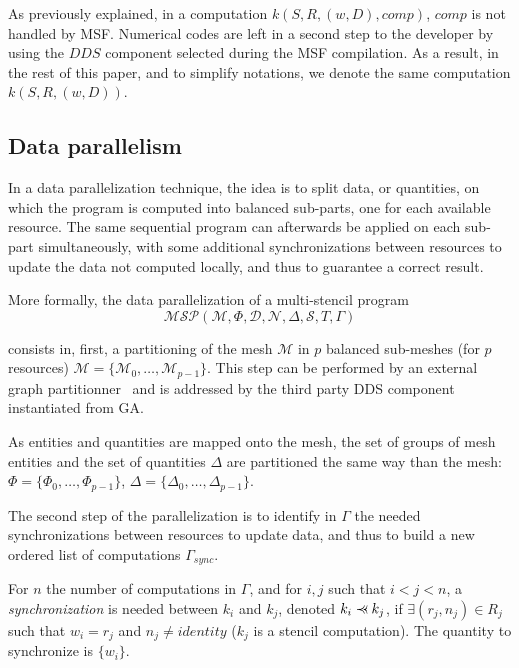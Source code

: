 As previously explained, in a computation $k(S,R,(w,D),comp)$, $comp$ is not handled by MSF. Numerical codes are left in a second step to the developer by using the $DDS$ component selected during the MSF compilation. As a result, in the rest of this paper, and to simplify notations, we denote the same computation $k(S,R,(w,D))$.

\subsection{Data parallelism}
\label{sect:dataparal}
In a data parallelization technique, the idea is to split data, or quantities, on which the program is computed into balanced sub-parts, one for each available resource. The same sequential program can afterwards be applied on each sub-part simultaneously, with some additional synchronizations between resources to update the data not computed locally, and thus to guarantee a correct result.

\medskip
More formally, the data parallelization of a multi-stencil program 
\begin{equation*}
\mathcal{MSP}(\mathcal{M},\Phi,\mathcal{D},\mathcal{N},\Delta, \mathcal{S},T,\Gamma)
\end{equation*}

consists in, first, a partitioning of the mesh $\mathcal{M}$ in $p$ balanced sub-meshes (for $p$ resources) $\mathcal{M}=\{\mathcal{M}_0,\dots,\mathcal{M}_{p-1}\}$. This step can be performed by an external graph partitionner~\cite{Pellegrini:1996:SSP:645560.658570,DBLP:conf/ieeehpcs/HeleneS13,lachat:hal-00768916} and is addressed by the third party DDS component instantiated from GA. 

As entities and quantities are mapped onto the mesh, the set of groups of mesh entities and the set of quantities $\Delta$ are partitioned the same way than the mesh: $\Phi=\{\Phi_0,\dots,\Phi_{p-1}\}$, $\Delta=\{\Delta_0,\dots,\Delta_{p-1}\}$. 

The second step of the parallelization is to identify in $\Gamma$ the needed synchronizations between resources to update data, and thus to build a new ordered list of computations $\Gamma_{sync}$.

\begin{mydef}
For $n$ the number of computations in $\Gamma$, and for $i,j$ such that $i<j<n$, a \textit{synchronization} is needed between $k_i$ and $k_j$, denoted $k_i \pprec k_j$, if $\exists (r_j,n_j) \in R_j$ such that $w_i=r_j$ and $n_j\neq identity$ ($k_j$ is a stencil computation). The quantity to synchronize is $\{w_i\}$.
\label{def:sync}
\end{mydef}

